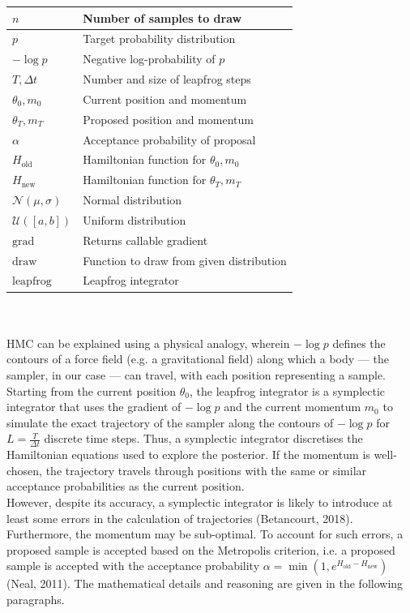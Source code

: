 \documentclass[conference]{IEEEtran}
\begin{document}
\begin{tabular}{| m{1.5cm} | m{6cm} |}
    \hline
    $n$ & Number of samples to draw\\
    \hline
    $p$ & Target probability distribution\\
    \hline
    $-\log p$ & Negative log-probability of $p$\\
    \hline
    $T, \Delta t$ & Number and size of leapfrog steps\\
    \hline
    $\theta_0, m_0$ & Current position and momentum\\
    \hline
    $\theta_T, m_T$ & Proposed position and momentum\\
    \hline
    $\alpha$ & Acceptance probability of proposal\\
    \hline
    $H_\text{old}$ & Hamiltonian function for $\theta_0, m_0$\\
    \hline
    $H_\text{new}$ & Hamiltonian function for $\theta_T, m_T$\\
    \hline
    $\mathcal{N}(\mu, \sigma)$ & Normal distribution\\
    \hline
    $\mathcal{U}([a, b])$ & Uniform distribution\\
    \hline
    $\text{grad}$ & Returns callable gradient\\
    \hline
    $\text{draw}$ & Function to draw from given distribution\\
    \hline
    $\text{leapfrog}$ & Leapfrog integrator\\
    \hline
\end{tabular}\\~\\

HMC can be explained using a physical analogy, wherein $-\log p$ defines the contours of a force field (e.g. a gravitational field) along which a body — the sampler, in our case — can travel, with each position representing a sample. Starting from the current position $\theta_0$, the leapfrog integrator is a symplectic integrator that uses the gradient of $-\log p$ and the current momentum $m_0$ to simulate the exact trajectory of the sampler along the contours of $-\log p$ for $L = \frac{T}{\Delta t}$ discrete time steps. Thus, a symplectic integrator discretises the Hamiltonian equations used to explore the posterior. If the momentum is well-chosen, the trajectory travels through positions with the same or similar acceptance probabilities as the current position.\\

However, despite its accuracy, a symplectic integrator is likely to introduce at least some errors in the calculation of trajectories (Betancourt, 2018). Furthermore, the momentum may be sub-optimal. To account for such errors, a proposed sample is accepted based on the Metropolis criterion, i.e. a proposed sample is accepted with the acceptance probability $\alpha = \min(1, e^{H_\text{old} - H_\text{new}})$ (Neal, 2011). The mathematical details and reasoning are given in the following paragraphs.\\
\end{document}
